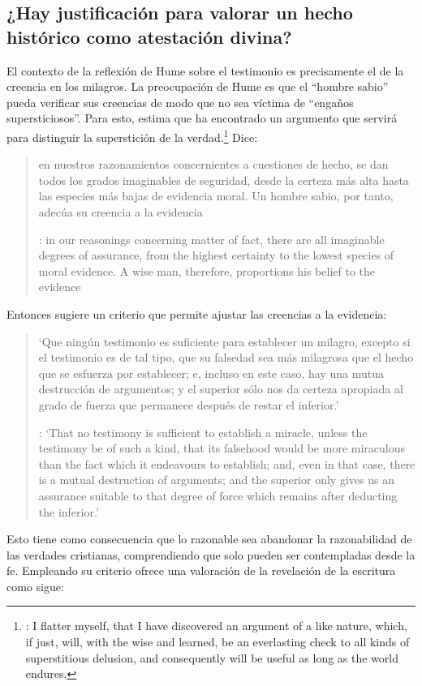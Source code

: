 \subsection{¿Hay justificación para valorar un hecho histórico como atestación divina?}

El contexto de la reflexión de Hume sobre el testimonio es precisamente el de la creencia en los milagros. La preocupación de Hume es que el \enquote{hombre sabio} pueda verificar sus creencias de modo que no sea víctima de \enquote{engaños supersticiosos}. Para esto, estima que ha encontrado un argumento que servirá para distinguir la superstición de la verdad.\footnote{\cite[Cf.~][\S10,1. 73]{hume1777enquiry}: I flatter myself, that I have discovered an argument of a like nature, which, if just, will, with the wise and learned, be an everlasting check to all kinds of superstitious delusion, and consequently will be useful as long as the world endures.} Dice: \blockquote[{\cite[\S10,1. 73]{hume1777enquiry}}: in our reasonings concerning matter of fact, there are all imaginable degrees of assurance, from the highest certainty to the lowest species of moral evidence. A wise man, therefore, proportions his belief to the evidence]{en nuestros razonamientos concernientes a cuestiones de hecho, se dan todos los grados imaginables de seguridad, desde la certeza más alta hasta las especies más bajas de evidencia moral. Un hombre sabio, por tanto, adecúa su creencia a la evidencia}.

Entonces sugiere un criterio que permite ajustar las creencias a la evidencia: \blockquote[{\cite[\S10,1. 77]{hume1777enquiry}}: `That no testimony is sufficient to establish a miracle, unless the testimony be of such a kind, that its falsehood would be more miraculous than the fact which it endeavours to establish; and, even in that case, there is a mutual destruction of arguments; and the superior only gives us an assurance suitable to that degree of force which remains after deducting the inferior.']{`Que ningún testimonio es suficiente para establecer un milagro, excepto si el testimonio es de tal tipo, que su falsedad sea más milagrosa que el hecho que se esfuerza por establecer; e, incluso en este caso, hay una mutua destrucción de argumentos; y el superior sólo nos da certeza apropiada al grado de fuerza que permanece después de restar el inferior.'}
\label{subsec:humarg}
  Esto tiene como consecuencia que lo razonable sea abandonar la razonabilidad de
  las verdades cristianas, comprendiendo que solo pueden ser contempladas desde la
  fe. Empleando su criterio ofrece una valoración de la revelación de la escritura
  como sigue:

